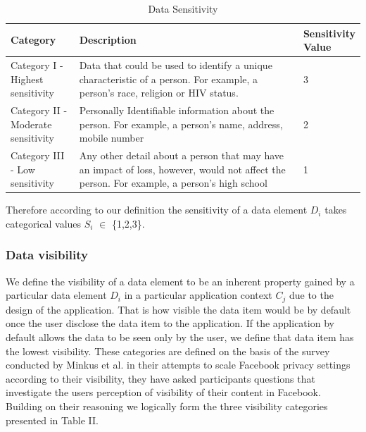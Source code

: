 \documentclass[conference]{IEEEtran}
\begin{document}
\begin{center}
\begin{table}[htbp]
\caption{Data Sensitivity}
\begin{center}
\begin{adjustbox}{width=0.5\textwidth} 
\begin{tabular}{|p{0.2\linewidth}|p{0.7\linewidth}|p{0.1\linewidth}|} 
\hline
Category & Description & Sensitivity Value \\
\hline
Category I - Highest sensitivity & Data that could be used to identify a unique characteristic of a person. For example, a person's race, religion or HIV status. & 3 \\
\hline
Category II - Moderate sensitivity & Personally Identifiable information about the person. For example, a person's name, address, mobile number & 2 \\
\hline
Category III - Low sensitivity & Any other detail about a person that may have an impact of loss, however, would not affect the person. For example, a person's high school & 1 \\
\hline
\end{tabular}
\end{adjustbox}
\end{center}
\end{table}
\end{center} 

Therefore according to our definition the sensitivity of a data element \textit {$D_i$} takes categorical values \textit {$S_i$} $\in$ \{1,2,3\}.

\subsubsection {Data visibility} We define the visibility of a data element to be an inherent property gained by a particular data element \textit{$D_i$} in a particular application context \textit{$C_j$} due to the design of the application. That is how visible the data item would be by default once the user disclose the data item to the application. If the application by default allows the data to be seen only by the user, we define that data item has the lowest visibility. These categories are defined on the basis of the survey conducted by Minkus et al. \cite{minkus2014scale} in their attempts to scale Facebook privacy settings according to their visibility, they have asked participants questions that investigate the users perception of visibility of their content in Facebook. Building on their reasoning we logically form the three visibility categories presented in Table II.
\end{document}
